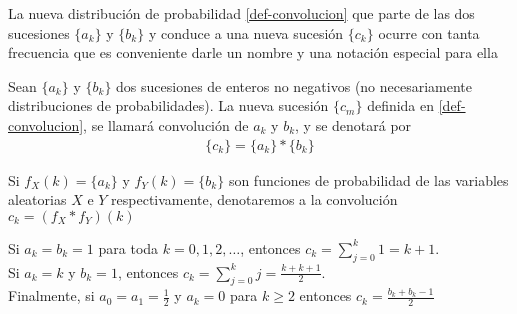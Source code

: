 La nueva distribución de probabilidad \ref{def-convolucion} que parte de las dos sucesiones $\{a_k\}$ y $\{b_k\}$ y conduce a una nueva sucesión $\{c_k\}$ ocurre con tanta frecuencia que es conveniente darle un nombre y una notación especial para ella
\begin{Def}
    Sean $\{a_k\}$ y $\{b_k\}$ dos sucesiones de enteros no negativos (no necesariamente distribuciones de probabilidades). La nueva sucesión $\{c_m\}$ definida en \ref{def-convolucion}, se llamará convolución de $a_k$ y $b_k$, y se denotará por
    \begin{eqnarray}
        \{c_k\}=\{a_k\}*\{b_k\}
        \label{def-notaciónConvolucion}
    \end{eqnarray}
\end{Def}
\begin{Obs}
    Si $f_X(k)=\{a_k\}$ y $f_Y(k)=\{b_k\}$ son funciones de probabilidad de las variables aleatorias $X$ e $Y$ respectivamente, denotaremos a la convolución $c_k=(f_X*f_Y)(k)$
\end{Obs}
\begin{Ejm}
    Si $a_k=b_k=1$ para toda $k=0,1,2,\ldots$, entonces $c_k=\sum_{j=0}^k 1=k+1$.\\Si $a_k=k$ y $b_k=1$, entonces $c_k=\sum_{j=0}^k j =\frac{k+k+1}{2}$.\\Finalmente, si $a_0=a_1=\frac{1}{2}$ y $a_k=0$ para $k\geq 2$ entonces $c_k=\frac{b_k+b_k-1}{2} $ 
\end{Ejm}